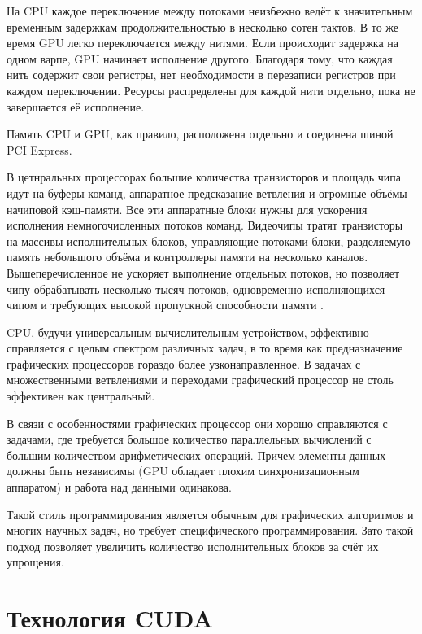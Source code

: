 \documentclass[a4paper,14pt,russian]{extreport}
\begin{document}
\par На CPU каждое переключение между потоками неизбежно ведёт к значительным временным задержкам продолжительностью в несколько сотен тактов. В то же время GPU легко переключается между нитями. Если происходит задержка на одном варпе, GPU начинает исполнение другого. Благодаря тому, что каждая нить содержит свои регистры, нет необходимости в перезаписи регистров при каждом переключении. Ресурсы распределены для каждой нити отдельно, пока не завершается её исполнение. 
\par Память CPU и GPU, как правило, расположена отдельно и соединена шиной PCI Express. 
\par В цетнральных процессорах большие количества транзисторов и площадь чипа идут на буферы команд, аппаратное предсказание ветвления и огромные объёмы начиповой кэш-памяти. Все эти аппаратные блоки нужны для ускорения исполнения немногочисленных потоков команд. Видеочипы тратят транзисторы на массивы исполнительных блоков, управляющие потоками блоки, разделяемую память небольшого объёма и контроллеры памяти на несколько каналов. Вышеперечисленное не ускоряет выполнение отдельных потоков, но позволяет чипу обрабатывать несколько тысяч потоков, одновременно исполняющихся чипом и требующих высокой пропускной способности памяти \cite{poletaev}.
\par CPU, будучи универсальным вычислительным устройством, эффективно справляется с целым спектром различных задач, в то время как предназначение графических процессоров гораздо более узконаправленное. В задачах с множественными ветвлениями и переходами графический процессор не столь эффективен как центральный.
\par В связи с особенностями графических процессор они хорошо справляются с задачами, где требуется большое количество параллельных вычислений с большим количеством арифметических операций. Причем элементы данных должны быть независимы (GPU обладает плохим синхронизационным аппаратом) и работа над данными одинакова. 
\par Такой стиль программирования является обычным для графических алгоритмов и многих научных задач, но требует специфического программирования. Зато такой подход позволяет увеличить количество исполнительных блоков за счёт их упрощения.


\section{Технология CUDA}
\end{document}
